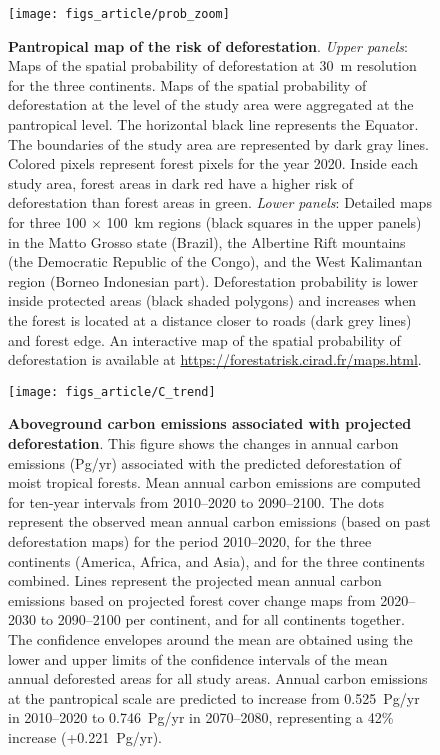 \documentclass[
  12pt,
]{article}
\begin{document}
\begin{figure}[H]

{\centering \texttt{[image: figs\_article/prob\_zoom]} 

}

\caption{\textbf{Pantropical map of the risk of deforestation}. \emph{Upper panels}: Maps of the spatial probability of deforestation at 30~m resolution for the three continents. Maps of the spatial probability of deforestation at the level of the study area were aggregated at the pantropical level. The horizontal black line represents the Equator. The boundaries of the study area are represented by dark gray lines. Colored pixels represent forest pixels for the year 2020. Inside each study area, forest areas in dark red have a higher risk of deforestation than forest areas in green. \emph{Lower panels}: Detailed maps for three 100 \(\times\) 100~km regions (black squares in the upper panels) in the Matto Grosso state (Brazil), the Albertine Rift mountains (the Democratic Republic of the Congo), and the West Kalimantan region (Borneo Indonesian part). Deforestation probability is lower inside protected areas (black shaded polygons) and increases when the forest is located at a distance closer to roads (dark grey lines) and forest edge. An interactive map of the spatial probability of deforestation is available at \url{https://forestatrisk.cirad.fr/maps.html}.}\label{fig:prob}
\end{figure}



\begin{figure}[H]

{\centering \texttt{[image: figs\_article/C\_trend]} 

}

\caption{\textbf{Aboveground carbon emissions associated with projected deforestation}. This figure shows the changes in annual carbon emissions (Pg/yr) associated with the predicted deforestation of moist tropical forests. Mean annual carbon emissions are computed for ten-year intervals from 2010--2020 to 2090--2100. The dots represent the observed mean annual carbon emissions (based on past deforestation maps) for the period 2010--2020, for the three continents (America, Africa, and Asia), and for the three continents combined. Lines represent the projected mean annual carbon emissions based on projected forest cover change maps from 2020--2030 to 2090--2100 per continent, and for all continents together. The confidence envelopes around the mean are obtained using the lower and upper limits of the confidence intervals of the mean annual deforested areas for all study areas. Annual carbon emissions at the pantropical scale are predicted to increase from 0.525~Pg/yr in 2010--2020 to 0.746~Pg/yr in 2070--2080, representing a 42\% increase (+0.221~Pg/yr).}\label{fig:c-em}
\end{figure}
\end{document}
